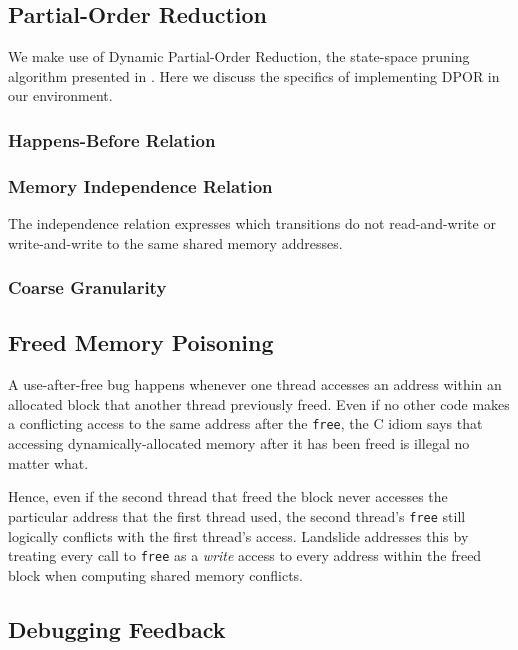 \subsection{Partial-Order Reduction}
\label{sec:techniques-por}

We make use of Dynamic Partial-Order Reduction, the state-space pruning algorithm presented in \cite{dpor}. Here we discuss the specifics of implementing DPOR in our environment.

\subsubsection{Happens-Before Relation}

\subsubsection{Memory Independence Relation}
\label{sec:por-independence}
The independence relation expresses which transitions do not read-and-write or write-and-write to the same shared memory addresses.

\subsubsection{Coarse Granularity}

\subsection{Freed Memory Poisoning}

A use-after-free bug happens whenever one thread accesses an address within an allocated block that another thread previously freed. Even if no other code makes a conflicting access to the same address after the \texttt{free}, the C idiom says that accessing dynamically-allocated memory after it has been freed is illegal no matter what.

Hence, even if the second thread that freed the block never accesses the particular address that the first thread used, the second thread's \texttt{free} still logically conflicts with the first thread's access. Landslide addresses this by treating every call to \texttt{free} as a {\em write} access to every address within the freed block when computing shared memory conflicts.

\subsection{Debugging Feedback}

